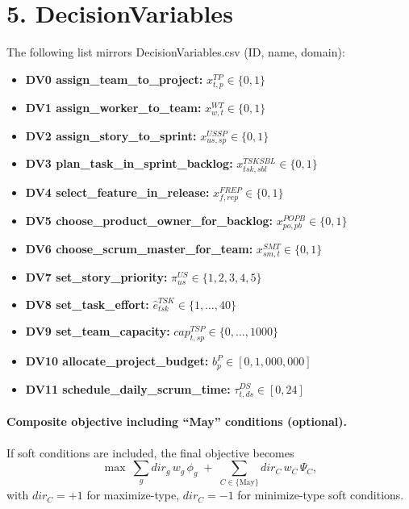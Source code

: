 \documentclass[11pt,a4paper]{article}
\begin{document}
\section{5. DecisionVariables}
The following list mirrors DecisionVariables.csv (ID, name, domain):
\begin{itemize}[leftmargin=2.2em]
  \item \textbf{DV0 assign\_team\_to\_project:} $x^{TP}_{t,p}\in\{0,1\}$
  \item \textbf{DV1 assign\_worker\_to\_team:} $x^{WT}_{w,t}\in\{0,1\}$
  \item \textbf{DV2 assign\_story\_to\_sprint:} $x^{USSP}_{us,sp}\in\{0,1\}$
  \item \textbf{DV3 plan\_task\_in\_sprint\_backlog:} $x^{TSKSBL}_{tsk,sbl}\in\{0,1\}$
  \item \textbf{DV4 select\_feature\_in\_release:} $x^{FREP}_{f,rep}\in\{0,1\}$
  \item \textbf{DV5 choose\_product\_owner\_for\_backlog:} $x^{POPB}_{po,pb}\in\{0,1\}$
  \item \textbf{DV6 choose\_scrum\_master\_for\_team:} $x^{SMT}_{sm,t}\in\{0,1\}$
  \item \textbf{DV7 set\_story\_priority:} $\pi^{US}_{us}\in\{1,2,3,4,5\}$
  \item \textbf{DV8 set\_task\_effort:} $\hat{e}^{TSK}_{tsk}\in\{1,\dots,40\}$
  \item \textbf{DV9 set\_team\_capacity:} $cap^{TSP}_{t,sp}\in\{0,\dots,1000\}$
  \item \textbf{DV10 allocate\_project\_budget:} $b^{P}_{p}\in[0,1{,}000{,}000]$
  \item \textbf{DV11 schedule\_daily\_scrum\_time:} $\tau^{DS}_{t,ds}\in[0,24]$
\end{itemize}

\paragraph{Composite objective including ``May'' conditions (optional).}
If soft conditions are included, the final objective becomes
\[
\max\ \sum_{g} dir_g\,w_g\,\phi_g
\;+\; \sum_{C\in\{\text{May}\}} dir_C\,w_C\,\Psi_C,
\]
with $dir_C=+1$ for maximize-type, $dir_C=-1$ for minimize-type soft conditions.
\end{document}
